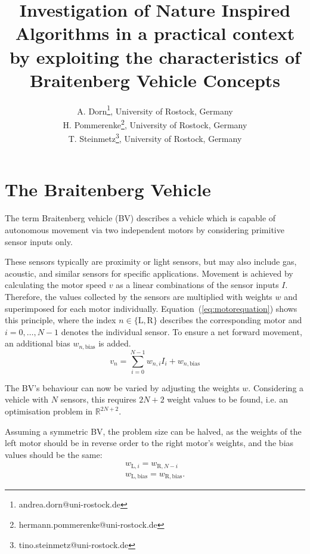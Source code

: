 \documentclass[a4paper]{jacow}
\begin{document}
\title{Investigation of Nature Inspired Algorithms in a practical context by exploiting the characteristics of Braitenberg Vehicle Concepts}

\author{A. Dorn\thanks{andrea.dorn@uni-rostock.de}, University of Rostock, Germany \\
		H. Pommerenke\thanks{hermann.pommerenke@uni-rostock.de}, University of Rostock, Germany \\
		T. Steinmetz\thanks{tino.steinmetz@uni-rostock.de}, University of Rostock, Germany}
	
\maketitle


\section{The Braitenberg Vehicle}

The term Braitenberg vehicle (BV) describes a vehicle which is capable of autonomous movement via two independent motors by considering primitive sensor inputs only.

These sensors typically are proximity or light sensors, but may also include gas, acoustic, and similar sensors for specific applications. Movement is achieved by calculating the motor speed $v$ as a linear combinations of the sensor inputs $I$. Therefore, the values collected by the sensors are multiplied with weights $w$ and superimposed for each motor individually. Equation~(\ref{eq:motorequation}) shows this principle, where the index $n\in\{\mathrm{L},\mathrm{R}\}$ describes the corresponding motor and $i=0,\ldots,N-1$ denotes the individual sensor. To ensure a net forward movement, an additional bias $w_{n,\text{bias}}$ is added.
\begin{equation}
	v_{n} = \sum\limits_{i=0}^{N-1} w_{n,i} I_{i} + w_{n,\text{bias}}
	\label{eq:motorequation}
\end{equation}

The BV's behaviour can now be varied by adjusting the weights $w$. Considering a vehicle with $N$ sensors, this requires $2N+2$ weight values to be found, i.e. an optimisation problem in $\mathbb{R}^{2N+2}$.

Assuming a symmetric BV, the problem size can be halved, as the weights of the left motor should be in reverse order to the right motor's weights, and the bias values should be the same:
\begin{align}
	w_{\mathrm{L}, i} = w_{\mathrm{R}, N-i} \nonumber \\
	w_{\mathrm{L},\text{bias}} = w_{\mathrm{R},\text{bias}}.\label{eq:symmetry}
\end{align}
\end{document}
